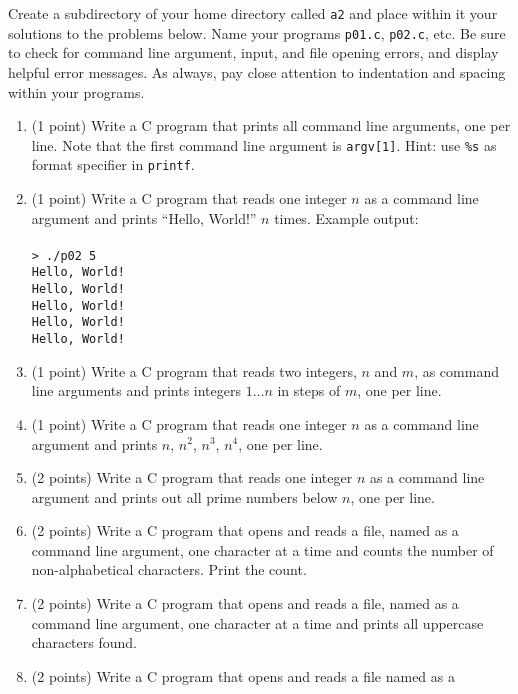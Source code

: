\documentclass[12pt]{article}
\begin{document}
\noindent
Create a subdirectory of your home directory called \texttt{a2} and place
within it your solutions to the problems below. Name your programs
\texttt{p01.c}, \texttt{p02.c}, etc. Be sure to check for command line
argument, input, and file opening errors, and display helpful error messages.
As always, pay close attention to indentation and spacing within your programs.

\begin{enumerate}
  \item (1 point) Write a C program that prints all command line arguments, one per line.
    Note that the first command line argument is
    \texttt{argv[1]}. Hint: use \texttt{\%s} as format specifier in
    \texttt{printf}.
  \item (1 point) Write a C program that reads one integer $n$ as a command line
    argument and prints ``Hello, World!'' $n$ times. Example output: \\ \\
    \texttt{> ./p02 5 \\ Hello, World! \\ Hello, World! \\ Hello, World! \\ Hello, World! \\ Hello, World!}
  \item (1 point) Write a C program that reads two integers, $n$ and $m$, as command line
    arguments and prints integers $1 \dots n$ in steps of $m$, one per line.
  \item (1 point) Write a C program that reads one integer $n$ as a command line argument
    and prints $n$, $n^2$, $n^3$, $n^4$, one per line.
  \item (2 points) Write a C program that reads one integer $n$ as a command
    line argument and prints out all prime numbers below $n$, one per line.
  \item (2 points) Write a C program that opens and reads a file, named as a
    command line argument, one character at a time and counts the number of
    non-alphabetical characters. Print the count.
  \item (2 points) Write a C program that opens and reads a file, named as a
    command line argument, one character at a time and prints all uppercase
    characters found.
  \item (2 points) Write a C program that opens and reads a file named as a

\end{enumerate}
\end{document}
